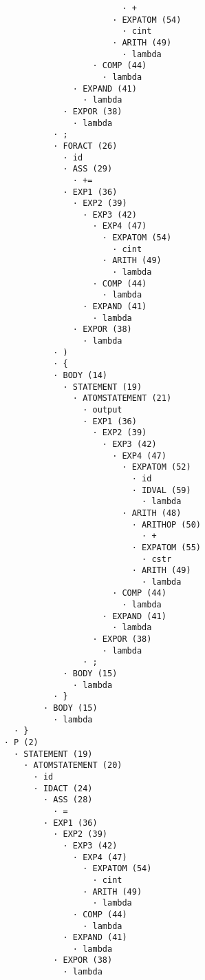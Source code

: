 \begin{enumerate}
\begin{tcolorbox}[title={Árbol sintáctico}, colback=white, breakable]
\begin{lstlisting}
                            · +
                          · EXPATOM (54)
                            · cint
                          · ARITH (49)
                            · lambda
                      · COMP (44)
                        · lambda
                  · EXPAND (41)
                    · lambda
                · EXPOR (38)
                  · lambda
              · ;
              · FORACT (26)
                · id
                · ASS (29)
                  · +=
                · EXP1 (36)
                  · EXP2 (39)
                    · EXP3 (42)
                      · EXP4 (47)
                        · EXPATOM (54)
                          · cint
                        · ARITH (49)
                          · lambda
                      · COMP (44)
                        · lambda
                    · EXPAND (41)
                      · lambda
                  · EXPOR (38)
                    · lambda
              · )
              · {
              · BODY (14)
                · STATEMENT (19)
                  · ATOMSTATEMENT (21)
                    · output
                    · EXP1 (36)
                      · EXP2 (39)
                        · EXP3 (42)
                          · EXP4 (47)
                            · EXPATOM (52)
                              · id
                              · IDVAL (59)
                                · lambda
                            · ARITH (48)
                              · ARITHOP (50)
                                · +
                              · EXPATOM (55)
                                · cstr
                              · ARITH (49)
                                · lambda
                          · COMP (44)
                            · lambda
                        · EXPAND (41)
                          · lambda
                      · EXPOR (38)
                        · lambda
                    · ;
                · BODY (15)
                  · lambda
              · }
            · BODY (15)
              · lambda
      · }
    · P (2)
      · STATEMENT (19)
        · ATOMSTATEMENT (20)
          · id
          · IDACT (24)
            · ASS (28)
              · =
            · EXP1 (36)
              · EXP2 (39)
                · EXP3 (42)
                  · EXP4 (47)
                    · EXPATOM (54)
                      · cint
                    · ARITH (49)
                      · lambda
                  · COMP (44)
                    · lambda
                · EXPAND (41)
                  · lambda
              · EXPOR (38)
                · lambda

\end{lstlisting}
\end{tcolorbox}
\end{enumerate}
